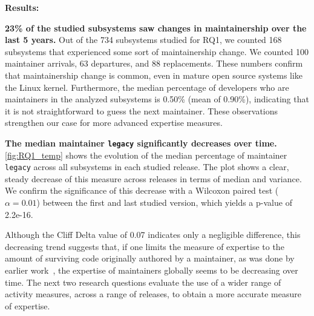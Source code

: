 {\bf Results:}

\textbf{23\% of the studied subsystems saw changes in maintainership over the last 5 years.} Out of the 734 subsystems studied for RQ1, we counted 168 subsystems that experienced some sort of maintainership change. We counted 100 maintainer arrivals, 63 departures, and 88 replacements. These numbers confirm that maintainership change is common, even in mature open source systems like the Linux kernel. Furthermore, the median percentage of developers who are maintainers in the analyzed subsystems is 0.50\% (mean of 0.90\%), indicating that it is not straightforward to guess the next maintainer. These observations strengthen our case for more advanced expertise measures.

\textbf{The median maintainer \texttt{legacy} significantly decreases over time.} \autoref{fig:RQ1_temp} shows the evolution of the median percentage of maintainer \texttt{legacy} across all subsystems in each studied release. The plot shows a clear, steady decrease of this measure across releases in terms of median and variance. We confirm the significance of this decrease with a Wilcoxon paired test ($\alpha=0.01$) between the first and last studied version, which yields a p-value of 2.2e-16.%


Although the Cliff Delta value of 0.07 indicates only a negligible difference, this decreasing trend suggests that, if one limits the measure of expertise to the amount of surviving code originally authored by a maintainer, as was done by earlier work~\citep{Rahman-2011}, the expertise of maintainers globally seems to be decreasing over time. The next two research questions evaluate the use of a wider range of activity measures, across a range of releases, to obtain a more accurate measure of expertise.




